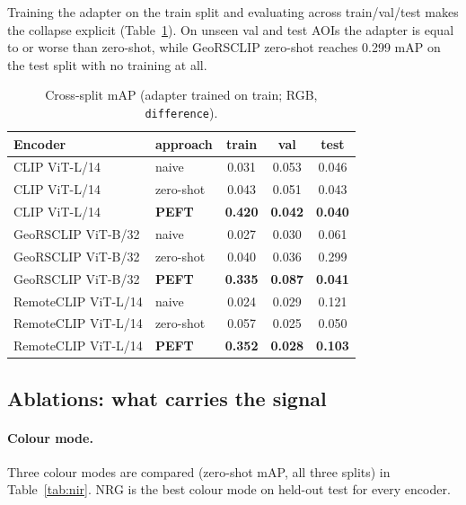 \documentclass{article}
\begin{document}
Training the adapter on the train split and evaluating across train/val/test
makes the collapse explicit (Table~\ref{tab:crosssplit}). On unseen val and test
AOIs the adapter is equal to or worse than zero-shot, while GeoRSCLIP zero-shot
reaches 0.299 mAP on the test split with no training at all.

\begin{table}[H]
    \centering
    \caption{Cross-split mAP (adapter trained on train; RGB, \texttt{difference}).}
    \label{tab:crosssplit}
    \begin{tabular}{llccc}
        \toprule
        \textbf{Encoder} & \textbf{approach} & \textbf{train} & \textbf{val} & \textbf{test} \\
        \midrule
        CLIP ViT-L/14       & naive     & 0.031 & 0.053 & 0.046 \\
        CLIP ViT-L/14       & zero-shot & 0.043 & 0.051 & 0.043 \\
        CLIP ViT-L/14       & \textbf{PEFT} & \textbf{0.420} & \textbf{0.042} & \textbf{0.040} \\
        GeoRSCLIP ViT-B/32  & naive     & 0.027 & 0.030 & 0.061 \\
        GeoRSCLIP ViT-B/32  & zero-shot & 0.040 & 0.036 & 0.299 \\
        GeoRSCLIP ViT-B/32  & \textbf{PEFT} & \textbf{0.335} & \textbf{0.087} & \textbf{0.041} \\
        RemoteCLIP ViT-L/14 & naive     & 0.024 & 0.029 & 0.121 \\
        RemoteCLIP ViT-L/14 & zero-shot & 0.057 & 0.025 & 0.050 \\
        RemoteCLIP ViT-L/14 & \textbf{PEFT} & \textbf{0.352} & \textbf{0.028} & \textbf{0.103} \\
        \bottomrule
    \end{tabular}
\end{table}

\subsection{Ablations: what carries the signal}
\label{sec:ablations}

\paragraph{Colour mode.}
Three colour modes are compared (zero-shot mAP, all three splits) in
Table~\ref{tab:nir}. NRG is the best colour mode on held-out test for every
encoder.
\end{document}
